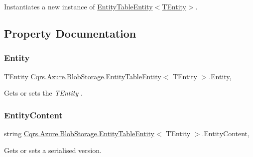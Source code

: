 Instantiates a new instance of \hyperlink{classCqrs_1_1Azure_1_1BlobStorage_1_1EntityTableEntity_a8d3f730147f5f9b37faeea0840db6a64_a8d3f730147f5f9b37faeea0840db6a64}{Entity\+Table\+Entity$<$\+T\+Entity$>$}. 



\subsection{Property Documentation}
\mbox{\label{classCqrs_1_1Azure_1_1BlobStorage_1_1EntityTableEntity_ac1f795a5b8c45645ebc71bcde126bcb5_ac1f795a5b8c45645ebc71bcde126bcb5}} 
\subsubsection{\texorpdfstring{Entity}{Entity}}
{\footnotesize\ttfamily T\+Entity \hyperlink{classCqrs_1_1Azure_1_1BlobStorage_1_1EntityTableEntity}{Cqrs.\+Azure.\+Blob\+Storage.\+Entity\+Table\+Entity}$<$ T\+Entity $>$.\hyperlink{classCqrs_1_1Entities_1_1Entity}{Entity}\hspace{0.3cm}{\ttfamily [get]}, {\ttfamily [set]}}



Gets or sets the {\itshape T\+Entity} . 

\mbox{\label{classCqrs_1_1Azure_1_1BlobStorage_1_1EntityTableEntity_ac6a2c9afc07bb6fae99c0906a408b5b6_ac6a2c9afc07bb6fae99c0906a408b5b6}} 
\subsubsection{\texorpdfstring{Entity\+Content}{EntityContent}}
{\footnotesize\ttfamily string \hyperlink{classCqrs_1_1Azure_1_1BlobStorage_1_1EntityTableEntity}{Cqrs.\+Azure.\+Blob\+Storage.\+Entity\+Table\+Entity}$<$ T\+Entity $>$.Entity\+Content\hspace{0.3cm}{\ttfamily [get]}, {\ttfamily [set]}}



Gets or sets a serialised version. 

